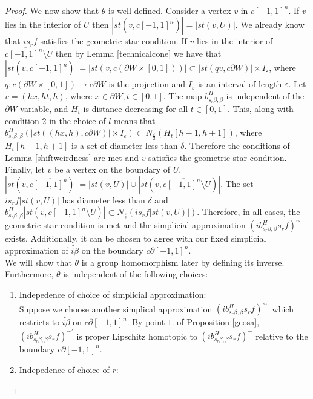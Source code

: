 \documentclass[a4paper,11pt]{article}
\theoremstyle{definition}
\theoremstyle{plain}
\theoremstyle{remark}
\begin{document}
{\begin{proof}
We now show that $\theta$ is well-defined. Consider a vertex $v$ in $c\overline{[-1,1]^n}$. If $v$ lies in the interior of $U$ then $|st(v, c\overline{[-1,1]^n})| = |st(v,U)|$. We already know that $is_{r}f$ satisfies the geometric star condition. If $v$ lies in the interior of $c\overline{[-1,1]^n}\setminus U$ then by Lemma \ref{technicalcone} we have that $|st(v, c\overline{[-1,1]^n})| = |st(v,c(\partial W \times [0,1]))| \subset |st(qv, c\partial W)| \times I_{\varepsilon}$, where $q: c(\partial W \times [0,1]) \rightarrow c\partial W$ is the projection and $I_{\varepsilon}$ is an interval of length $\varepsilon$. Let $v= (hx,ht,h)$, where $x\in \partial W, t\in [0,1]$. The map $b^H_{s_{r}\beta,\beta}$ is independent of the $\partial W$-variable, and $H_{t}$ is distance-decreasing for all $t\in[0,1]$. This, along with condition $2$ in the choice of $l$ means that $b^H_{s_{r}\beta,\beta}(|st((hx,h), c\partial W)| \times I_{\varepsilon})\subset N_{\frac{\varepsilon}{2}}(H_{t}[h-1,h+1])$, where $H_{t}[h-1,h+1]$ is a set of diameter less than $\delta$. Therefore the conditions of Lemma \ref{shiftweirdness} are met and $v$ satisfies the geometric star condition. Finally, let $v$ be a vertex on the boundary of $U$. $|st(v, c\overline{[-1,1]^n})|= |st(v,U)| \cup |st(v,c\overline{[-1,1]^n}\setminus U)|$. The set $is_{r}f|st(v,U)|$ has diameter less than $\delta$ and $b^H_{s_{r}\beta,\beta}|st(v,c[-1,1]^n\setminus U)|\subset N_{\frac{\varepsilon}{2}}(is_{r}f|st(v,U)|)$. Therefore, in all cases, the geometric star condition is met and the simplicial approximation $(ib^H_{s_{r}\beta,\beta}s_{r}f)^{\sim}$ exists. Additionally, it can be chosen to agree with our fixed simplicial approximation of $\widetilde{i\beta}$ on the boundary $c\partial[-1,1]^n$. \\

We will show that $\theta$ is a group homomorphism later by defining its inverse. Furthermore, $\theta$ is independent of the following choices: 

\begin{enumerate}
\item Indepedence of choice of simplicial approximation: \\

Suppose we choose another simplical approximation $(ib^H_{s_{r}\beta,\beta}s_{r}f)^{\sim'}$ which restricts to $\widetilde{i\beta}$ on $c\partial[-1,1]^n$. By point $1.$ of Proposition \ref{geosa}, $(ib^H_{s_{r}\beta,\beta}s_{r}f)^{\sim'}$ is proper Lipschitz homotopic to $(ib^H_{s_{r}\beta,\beta}s_{r}f)^{\sim}$ relative to the boundary $c\partial[-1,1]^n$. 
\item Indepedence of choice of $r$:\\


\end{enumerate}
\end{proof}}
\end{document}
